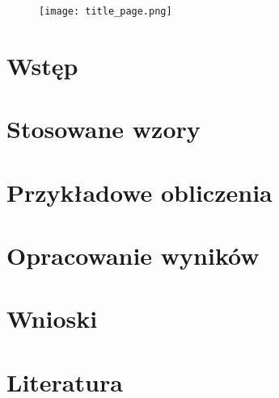 \documentclass[12pt, a4paper, oneside]{article}
\begin{document}
\begin{figure}[h]
\centering
\texttt{[image: title\_page.png]}
\end{figure}
\clearpage
{}
\section{Wstęp}
\section{Stosowane wzory}
\section{Przykładowe obliczenia}
\section{Opracowanie wyników}
\section{Wnioski}
\section{Literatura}
\end{document}
